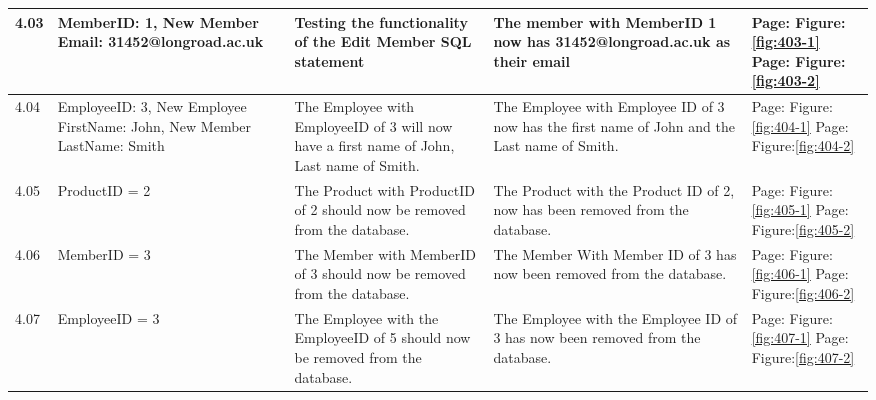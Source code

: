 \begin{flushleft}
\begin{longtable}{|p{1.0cm}|p{2.5cm}|p{3cm}|p{3.0cm}|p{2.5cm}|}
	4.03 & MemberID: 1, New Member Email: 31452@longroad.ac.uk & Testing the functionality of the Edit Member SQL statement & The member with MemberID 1 now has 31452@longroad.ac.uk as their email &  Page:\pageref{fig:403-1}  \newline Figure:\ref{fig:403-1} \newline \newline  Page:\pageref{fig:403-2}  \newline Figure:\ref{fig:403-2}\\ \hline
	4.04 & EmployeeID: 3, New Employee FirstName: John, New Member LastName: Smith  & The Employee with EmployeeID of 3 will now have a first name of John, Last name of Smith.& The Employee with Employee ID of 3 now has the first name of John and the Last name of Smith. &  Page:\pageref{fig:404-1}  \newline Figure:\ref{fig:404-1} \newline \newline  Page:\pageref{fig:404-2}  \newline Figure:\ref{fig:404-2}\\ \hline 
	4.05 & ProductID = 2 & The Product with ProductID of 2 should now be removed from the database.& The Product with the Product ID of 2, now has been removed from the database.& Page:\pageref{fig:405-1}  \newline Figure:\ref{fig:405-1} \newline \newline  Page:\pageref{fig:405-2}  \newline Figure:\ref{fig:405-2}\\ \hline
	4.06 & MemberID = 3 & The Member with MemberID of 3 should now be removed from the database.& The Member With Member ID of 3 has now been removed from the database.& Page:\pageref{fig:406-1}  \newline Figure:\ref{fig:406-1} \newline \newline  Page:\pageref{fig:406-2}  \newline Figure:\ref{fig:406-2}\\ \hline
	4.07 & EmployeeID = 3 & The Employee with the EmployeeID of 5 should now be removed from the database. & The Employee with the Employee ID of 3 has now been removed from the database.& Page:\pageref{fig:407-1}  \newline Figure:\ref{fig:407-1} \newline \newline  Page:\pageref{fig:407-2}  \newline Figure:\ref{fig:407-2} \\ \hline

\end{longtable}
\end{flushleft}
